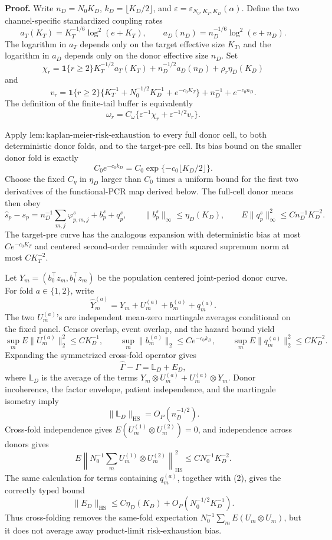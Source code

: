 \textbf{Proof.}
Write \(n_D=N_0K_D\), \(k_D=\lfloor K_D/2\rfloor\), and \(\varepsilon=\varepsilon_{N_0,K_T,K_D}(\alpha)\). Define the two channel-specific standardized coupling rates
\[
 a_T(K_T)=K_T^{-1/6}\log^2(e+K_T),
 \qquad
 a_D(n_D)=n_D^{-1/6}\log^2(e+n_D).
\]
The logarithm in \(a_T\) depends only on the target effective size \(K_T\), and the logarithm in \(a_D\) depends only on the donor effective size \(n_D\). Set
\[
 \chi_r=\mathbf 1\{r\ge2\}K_T^{-1/2}a_T(K_T)
       +n_D^{-1/2}a_D(n_D)+\rho_r\eta_D(K_D)
\]
and
\[
 v_r=\mathbf 1\{r\ge2\}
 \{K_T^{-1}+N_0^{-1/2}K_D^{-1}+e^{-c_0K_T}\}
 +n_D^{-1}+e^{-c_0n_D}.
\]
The definition of the finite-tail buffer is equivalently
\[
 \omega_r=C_\omega\{\varepsilon^{-1}\chi_r+\varepsilon^{-1/2}v_r\}. \tag{1}
\]

Apply \(\mathrm{lem:kaplan\mbox{-}meier\mbox{-}risk\mbox{-}exhaustion}\) to every full donor cell, to both deterministic donor folds, and to the target-pre cell. Its bias bound on the smaller donor fold is exactly
\[
 C_0e^{-c_0k_D}=C_0\exp\{-c_0\lfloor K_D/2\rfloor\}. \tag{2}
\]
Choose the fixed \(C_\eta\) in \(\eta_D\) larger than \(C_0\) times a uniform bound for the first two derivatives of the functional-PCR map derived below. The full-cell donor means then obey
\[
 \widehat s_p-s_p
 =n_D^{-1}\sum_{m,j}\varphi^s_{p,m,j}+b^s_p+q^s_p,
 \qquad
 \|b^s_p\|_\infty\le\eta_D(K_D),
 \qquad
 E\|q^s_p\|_\infty^2\le Cn_D^{-1}K_D^{-2}. \tag{3}
\]
The target-pre curve has the analogous expansion with deterministic bias at most \(Ce^{-c_0K_T}\) and centered second-order remainder with squared supremum norm at most \(CK_T^{-2}\).

Let \(Y_m=(b_0^\top z_m,b_1^\top z_m)\) be the population centered joint-period donor curve. For fold \(a\in\{1,2\}\), write
\[
 \widehat Y_m^{(a)}=Y_m+U_m^{(a)}+b_m^{(a)}+q_m^{(a)}. \tag{4}
\]
The two \(U_m^{(a)}\)'s are independent mean-zero martingale averages conditional on the fixed panel. Censor overlap, event overlap, and the hazard bound yield
\[
 \sup_mE\|U_m^{(a)}\|_2^2\le CK_D^{-1},\qquad
 \sup_m\|b_m^{(a)}\|_2\le Ce^{-c_0k_D},\qquad
 \sup_mE\|q_m^{(a)}\|_2^2\le CK_D^{-2}. \tag{5}
\]
Expanding the symmetrized cross-fold operator gives
\[
 \widehat\Gamma-\Gamma=\mathbb L_D+E_D, \tag{6}
\]
where \(\mathbb L_D\) is the average of the terms \(Y_m\otimes U_m^{(a)}+U_m^{(a)}\otimes Y_m\). Donor incoherence, the factor envelope, patient independence, and the martingale isometry imply
\[
 \|\mathbb L_D\|_{\mathrm{HS}}=O_P(n_D^{-1/2}). \tag{7}
\]
Cross-fold independence gives \(E(U_m^{(1)}\otimes U_m^{(2)})=0\), and independence across donors gives
\[
 E\left\|N_0^{-1}\sum_mU_m^{(1)}\otimes U_m^{(2)}\right\|_{\mathrm{HS}}^2
 \le CN_0^{-1}K_D^{-2}. \tag{8}
\]
The same calculation for terms containing \(q_m^{(a)}\), together with (2), gives the correctly typed bound
\[
 \|E_D\|_{\mathrm{HS}}
 \le C\eta_D(K_D)+O_P(N_0^{-1/2}K_D^{-1}). \tag{9}
\]
Thus cross-folding removes the same-fold expectation \(N_0^{-1}\sum_mE(U_m\otimes U_m)\), but it does not average away product-limit risk-exhaustion bias.

